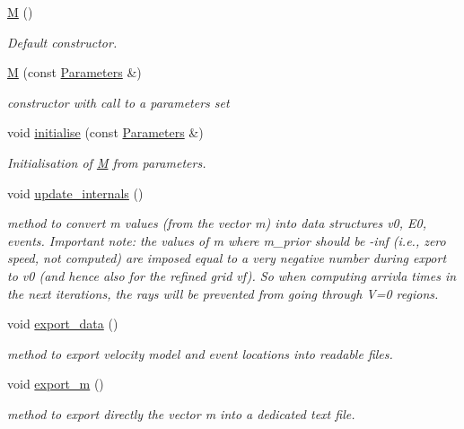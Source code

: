 \begin{DoxyCompactItemize}
\item 
\hypertarget{class_m_a5466fd39fe84f5612cb451d4b019b2b5}{}\hyperlink{class_m_a5466fd39fe84f5612cb451d4b019b2b5}{M} ()\label{class_m_a5466fd39fe84f5612cb451d4b019b2b5}

\begin{DoxyCompactList}\small\item\em Default constructor. \end{DoxyCompactList}\item 
\hypertarget{class_m_aac816311b2e43c2dd92bf70ef4bf4c4e}{}\hyperlink{class_m_aac816311b2e43c2dd92bf70ef4bf4c4e}{M} (const \hyperlink{class_parameters}{Parameters} \&)\label{class_m_aac816311b2e43c2dd92bf70ef4bf4c4e}

\begin{DoxyCompactList}\small\item\em constructor with call to a parameters set \end{DoxyCompactList}\item 
void \hyperlink{class_m_a7371d3ae555c21f0555fd8d30e76160b}{initialise} (const \hyperlink{class_parameters}{Parameters} \&)
\begin{DoxyCompactList}\small\item\em Initialisation of \hyperlink{class_m}{M} from parameters. \end{DoxyCompactList}\item 
\hypertarget{class_m_aa5bb4779a1c249dc8249f7e6a702f8bf}{}void \hyperlink{class_m_aa5bb4779a1c249dc8249f7e6a702f8bf}{update\+\_\+internals} ()\label{class_m_aa5bb4779a1c249dc8249f7e6a702f8bf}

\begin{DoxyCompactList}\small\item\em method to convert m values (from the vector m) into data structures v0, E0, events. Important note\+: the values of m where m\+\_\+prior should be -\/inf (i.\+e., zero speed, not computed) are imposed equal to a very negative number during export to v0 (and hence also for the refined grid vf). So when computing arrivla times in the next iterations, the rays will be prevented from going through V=0 regions. \end{DoxyCompactList}\item 
void \hyperlink{class_m_a8d9192b1fabcfdb0a4e860ff41e23827}{export\+\_\+data} ()
\begin{DoxyCompactList}\small\item\em method to export velocity model and event locations into readable files. \end{DoxyCompactList}\item 
\hypertarget{class_m_ab4b29e117e8249308cf4f738b2e470da}{}void \hyperlink{class_m_ab4b29e117e8249308cf4f738b2e470da}{export\+\_\+m} ()\label{class_m_ab4b29e117e8249308cf4f738b2e470da}

\begin{DoxyCompactList}\small\item\em method to export directly the vector m into a dedicated text file. \end{DoxyCompactList}\end{DoxyCompactItemize}
